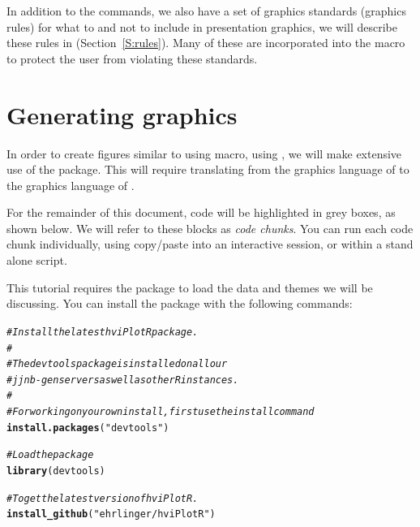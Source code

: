 \documentclass[nojss]{jss}\usepackage[]{graphicx}\usepackage[]{color}
\makeatletter
\newcommand{\hlstr}[1]{\textcolor[rgb]{0.192,0.494,0.8}{#1}}%
\newcommand{\hlcom}[1]{\textcolor[rgb]{0.678,0.584,0.686}{\textit{#1}}}%
\newcommand{\hlstd}[1]{\textcolor[rgb]{0.345,0.345,0.345}{#1}}%
\newcommand{\hlkwd}[1]{\textcolor[rgb]{0.737,0.353,0.396}{\textbf{#1}}}%
\newenvironment{kframe}{%
 \def\at@end@of@kframe{}%
 \ifinner\ifhmode%
  \def\at@end@of@kframe{\end{minipage}}%
  \begin{minipage}{\columnwidth}%
 \fi\fi%
 \def\FrameCommand##1{\hskip\@totalleftmargin \hskip-\fboxsep
 \colorbox{shadecolor}{##1}\hskip-\fboxsep
     \hskip-\linewidth \hskip-\@totalleftmargin \hskip\columnwidth}%
 \MakeFramed {\advance\hsize-\width
   \@totalleftmargin\z@ \linewidth\hsize
   \@setminipage}}%
 {\par\unskip\endMakeFramed%
 \at@end@of@kframe}
\newenvironment{knitrout}{}{} %
\makeatother
\begin{document}
In addition to the  commands, we also have a set of graphics standards (graphics rules) for what to and not to include in presentation graphics, we will describe these rules in (Section~\ref{S:rules}). Many of these are incorporated into the  macro to protect the user from violating these standards.

\section[Generating ggplot2 graphics]{Generating  graphics}\label{S:ggplot2tuple}

In order to create figures similar to using  macro, using , we will make extensive use of the  package. This will require translating from the graphics language of  to the graphics language of . 

For the remainder of this document,  code will be highlighted in grey boxes, as shown below. We will refer to these blocks as \emph{code chunks}. You can run each code chunk individually, using copy/paste into an interactive  session, or within a stand alone  script.

This tutorial requires the  package to load the data and themes we will be discussing. You can install the package with the following commands:
\begin{knitrout}\footnotesize
{}\color{fgcolor}\begin{kframe}
\begin{alltt}
\hlcom{# Install the latest hviPlotR package.}
\hlcom{#}
\hlcom{# The devtools package is installed on all our }
\hlcom{# jjnb-gen servers as well as other R instances.}
\hlcom{#}
\hlcom{# For working on your own install, first use the install command}
\hlkwd{install.packages}\hlstd{(}\hlstr{"devtools"}\hlstd{)}

\hlcom{# Load the package}
\hlkwd{library}\hlstd{(devtools)}

\hlcom{# To get the latest version of hviPlotR.}
\hlkwd{install_github}\hlstd{(}\hlstr{"ehrlinger/hviPlotR"}\hlstd{)}
\end{alltt}
\end{kframe}
\end{knitrout}
\end{document}
